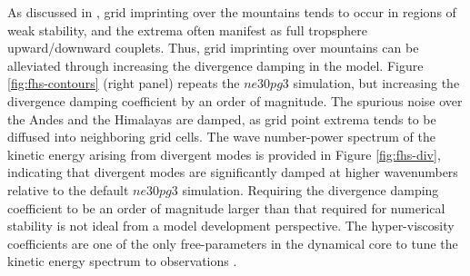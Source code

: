 \documentclass{agujournal}
\begin{document}
As discussed in \cite{HL2018MWR}, grid imprinting over the mountains tends to occur in regions of weak stability, and the extrema often  manifest as full tropsphere upward/downward couplets. Thus, grid imprinting over mountains can be alleviated through increasing the divergence damping in the model. Figure \ref{fig:fhs-contours} (right panel) repeats the $ne30pg3$ simulation, but increasing the divergence damping coefficient by an order of magnitude. The spurious noise over the Andes and the Himalayas are damped, as grid point extrema tends to be diffused into neighboring grid cells. The wave number-power spectrum of the kinetic energy arising from divergent modes is provided in Figure \ref{fig:fhs-div}, indicating that divergent modes are significantly damped at higher wavenumbers relative to the default $ne30pg3$ simulation. Requiring the divergence damping coefficient to be an order of magnitude larger than that required for numerical stability is not ideal from a model development perspective. The hyper-viscosity coefficients are one of the only free-parameters in the dynamical core to tune the kinetic energy spectrum to observations \citep{SPKS2014JAS,LetAl2018JAMES}.
\end{document}
